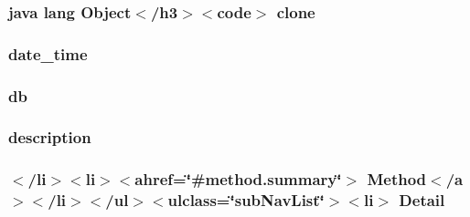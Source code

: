 \hypertarget{_cloudia_d_b_8html_adc9607fcabf6f2d7f401ad52015ef6e0}{
\subsubsection[{clone}]{\setlength{\rightskip}{0pt plus 5cm}java lang Object$<$/h3$>$$<$code$>$ clone}}\label{_cloudia_d_b_8html_adc9607fcabf6f2d7f401ad52015ef6e0}
\hypertarget{_cloudia_d_b_8html_a2ebe356a2a4f9bab3a6c50f65ccc86d5}{
\subsubsection[{date\-\_\-time}]{\setlength{\rightskip}{0pt plus 5cm}date\-\_\-time}}\label{_cloudia_d_b_8html_a2ebe356a2a4f9bab3a6c50f65ccc86d5}
\hypertarget{_cloudia_d_b_8html_a89a7f6028a19c3dc081cc5f16eb53891}{
\subsubsection[{db}]{\setlength{\rightskip}{0pt plus 5cm}db}}\label{_cloudia_d_b_8html_a89a7f6028a19c3dc081cc5f16eb53891}
\hypertarget{_cloudia_d_b_8html_a2661f439a4a94ffdcd5e47ae1da0bb1d}{
\subsubsection[{description}]{\setlength{\rightskip}{0pt plus 5cm}description}}\label{_cloudia_d_b_8html_a2661f439a4a94ffdcd5e47ae1da0bb1d}
\hypertarget{_cloudia_d_b_8html_a1e04b5ec07bcd5281e26dcd40e5b3a94}{
\subsubsection[{Detail}]{\setlength{\rightskip}{0pt plus 5cm}$<$/li$>$$<$li$>$$<$ahref=\char`\"{}\#method.\-summary\char`\"{}$>$ Method$<$/{\bf a}$>$$<$/li$>$$<$/ul$>$$<$ulclass=\char`\"{}sub\-Nav\-List\char`\"{}$>$$<$li$>$ Detail}}\label{_cloudia_d_b_8html_a1e04b5ec07bcd5281e26dcd40e5b3a94}

